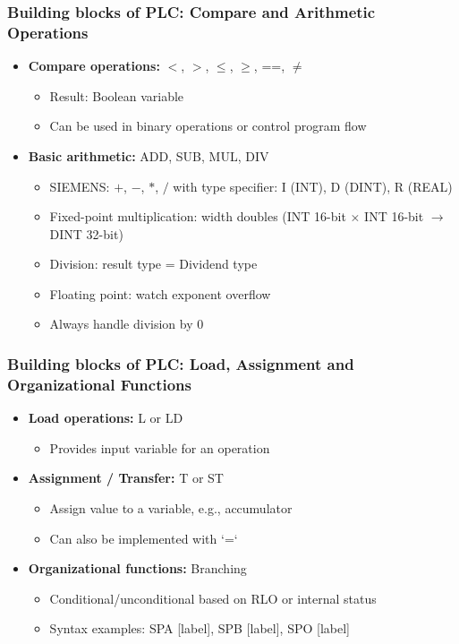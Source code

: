 \begin{frame}
	\frametitle{Building blocks of PLC: Compare and Arithmetic Operations}
	\footnotesize
	\begin{itemize}
		\item \textbf{Compare operations:} $<$, $>$, $\leq$, $\geq$, ==, $\neq$
		\begin{itemize}
			\item Result: Boolean variable
			\item Can be used in binary operations or control program flow
		\end{itemize}
		\item \textbf{Basic arithmetic:} ADD, SUB, MUL, DIV
		\begin{itemize}
			\item SIEMENS: $+$, $-$, $*$, $/$ with type specifier: I (INT), D (DINT), R (REAL)
			\item Fixed-point multiplication: width doubles (INT 16-bit $\times$ INT 16-bit $\rightarrow$ DINT 32-bit)
			\item Division: result type = Dividend type
			\item Floating point: watch exponent overflow
			\item Always handle division by 0
		\end{itemize}
	\end{itemize}
\end{frame}

\begin{frame}
	\frametitle{Building blocks of PLC: Load, Assignment and Organizational Functions}
	\footnotesize
	\begin{itemize}
		\item \textbf{Load operations:} L or LD
		\begin{itemize}
			\item Provides input variable for an operation
		\end{itemize}
		\item \textbf{Assignment / Transfer:} T or ST
		\begin{itemize}
			\item Assign value to a variable, e.g., accumulator
			\item Can also be implemented with `=`
		\end{itemize}
		\item \textbf{Organizational functions:} Branching
		\begin{itemize}
			\item Conditional/unconditional based on RLO or internal status
			\item Syntax examples: SPA [label], SPB [label], SPO [label]
		\end{itemize}
	\end{itemize}
\end{frame}

